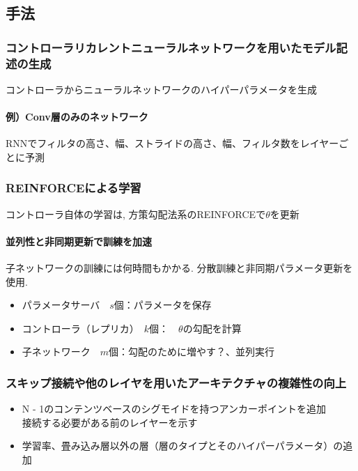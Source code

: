 \documentclass[twocolumn]{jarticle}     %
\begin{document}
\subsection{手法}
\subsubsection{コントローラリカレントニューラルネットワークを用いたモデル記述の生成}
コントローラからニューラルネットワークのハイパーパラメータを生成\\

\paragraph{例）Conv層のみのネットワーク\\}
RNNでフィルタの高さ、幅、ストライドの高さ、幅、フィルタ数をレイヤーごとに予測\\

\subsubsection{REINFORCEによる学習}
コントローラ自体の学習は, 方策勾配法系のREINFORCEで$\theta$を更新

\paragraph{並列性と非同期更新で訓練を加速}
子ネットワークの訓練には何時間もかかる.
分散訓練と非同期パラメータ更新を使用.
\begin{itemize}
  \item パラメータサーバ　$s$個：パラメータを保存
  \item コントローラ（レプリカ）　$k$個：　$\theta$の勾配を計算
  \item 子ネットワーク　$m$個：勾配のために増やす？、並列実行
\end{itemize}

\subsubsection{スキップ接続や他のレイヤを用いたアーキテクチャの複雑性の向上}
\begin{itemize}
  \item N - 1のコンテンツベースのシグモイドを持つアンカーポイントを追加\\
        接続する必要がある前のレイヤーを示す
  \item 学習率、畳み込み層以外の層（層のタイプとそのハイパーパラメータ）の追加
\end{itemize}
\end{document}
